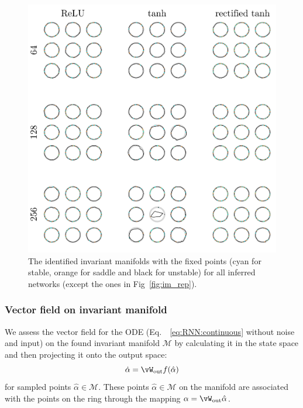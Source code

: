 \documentclass{article} %
\newcounter{ct}
\newcommand{\wout}{\vW_{\text{out}}}
\newcommand{\manifold}{\mathcal{M}}
\theoremstyle{definition}
\theoremstyle{remark}
\begin{document}
\newpage
\begin{figure}[tbhp]
     \centering
    \includegraphics[width=\textwidth]{im_all_3x3}
       \caption{The identified invariant manifolds with the fixed points (cyan for stable, orange for saddle and black for unstable) for all inferred networks (except the ones in Fig~\ref{fig:im_rep}).}
       \label{fig:im_all}
\end{figure}






\newpage
 \subsubsection{Vector field on invariant manifold}\label{sec:supp:vf}

 We assess the vector field for the ODE (Eq.~~\ref{eq:RNN:continuous} without noise and input) on the found invariant manifold \(\manifold\) by calculating it in the state space
 and then projecting it onto the output space:
 \begin{equation}
\dot \alpha =  \wout f(\hat \alpha) %
\end{equation}
for sampled points \(\hat \alpha\in \manifold\).
These points \(\hat \alpha\in \manifold\) on the manifold are associated with the points on the ring through the mapping \(\alpha = \wout\hat\alpha\).
\end{document}
